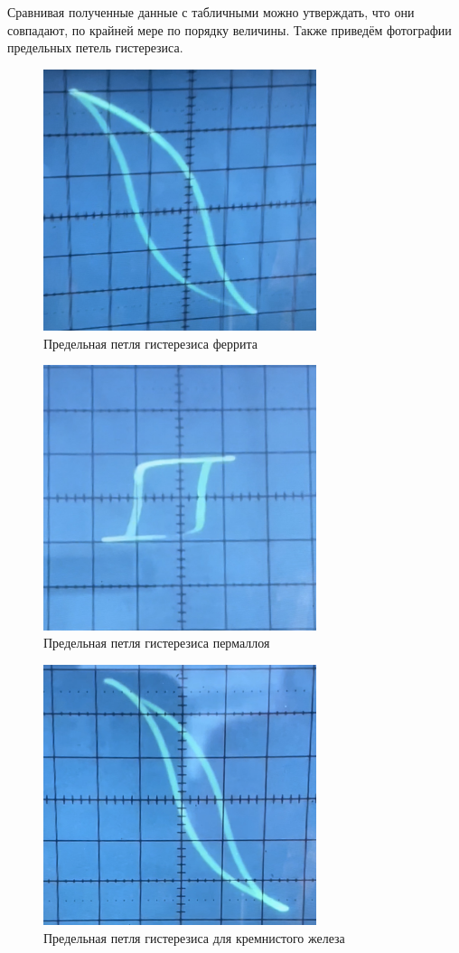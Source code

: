 \documentclass[12pt,a4paper]{article}
\begin{document}
Сравнивая полученные данные с табличными можно утверждать, что они совпадают, по крайней мере по порядку величины. Также приведём фотографии предельных петель гистерезиса.

\begin{figure}[h!]
	\centering
	\includegraphics[width=8cm]{src/ferrit.jpg}
	\caption{Предельная петля гистерезиса феррита}
\end{figure}
\begin{figure}[h!]
	\centering
	\includegraphics[width=8cm]{src/permal.jpg}
	\caption{Предельная петля гистерезиса пермаллоя}
\end{figure}
\newpage
\begin{figure}[h!]
	\centering
	\includegraphics[width=8cm]{src/silicon_fe.jpg}
	\caption{Предельная петля гистерезиса для кремнистого железа}
\end{figure}
\end{document}
